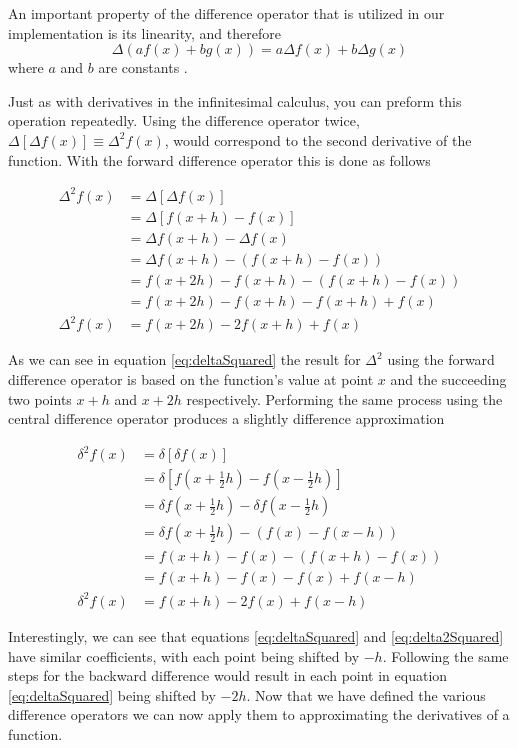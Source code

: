 \documentclass[authoryearcitations]{UoYCSproject}
\begin{document}
An important property of the difference operator that is utilized in our implementation is its linearity,
 and therefore
$$\Delta (af(x) + bg(x)) = a \Delta f(x) + b\Delta g(x) $$
where $a$ and $b$ are constants \cite{Hamming}. 

Just as with derivatives in the infinitesimal calculus, you can preform this operation repeatedly. Using the difference
operator twice, $\Delta [\Delta f(x) ] \equiv \Delta ^2 f(x) $, would correspond to the second derivative of the function. 
With the forward difference operator this is done as follows

\begin{align}
 \Delta ^2 f(x)&= \Delta [\Delta f(x)]  \nonumber\\
		&= \Delta [f(x + h) - f(x)] \nonumber\\
		&= \Delta f(x + h) - \Delta f(x) \nonumber\\  
		&= \Delta f(x + h) - (f(x + h) - f(x)) \nonumber \\
		&= f(x + 2h) - f(x + h) - (f(x + h) - f(x)) \nonumber \\ 
		&= f(x + 2h) - f(x + h) - f(x + h) + f(x) \nonumber \\
 \Delta ^2 f(x)	&= f(x + 2h) - 2f(x + h) + f(x) \label{eq:deltaSquared}
\end{align}

As we can see in equation \ref{eq:deltaSquared} the result for $\Delta ^2$ using the forward difference operator is based 
on the function's value at point $x$ and the succeeding two points $x+h$ and $x+2h$ respectively. Performing the same 
process using the central difference operator produces a slightly difference approximation

\begin{align}
 \delta ^2 f(x)&= \delta [\delta f(x)]  \nonumber\\
		&= \delta [f(x + \frac{1}{2}h) - f(x - \frac{1}{2}h)] \nonumber\\
		&= \delta f(x + \frac{1}{2}h) - \delta f(x - \frac{1}{2}h) \nonumber\\  
		&= \delta f(x + \frac{1}{2}h) - (f(x) - f(x - h)) \nonumber \\
		&= f(x + h) - f(x) - (f(x + h) - f(x)) \nonumber \\ 
		&= f(x + h) - f(x) - f(x) + f(x - h) \nonumber \\
 \delta ^2 f(x)	&= f(x + h) - 2f(x) + f(x - h)\label{eq:delta2Squared}
\end{align}


Interestingly, we can see that equations \ref{eq:deltaSquared} and \ref{eq:delta2Squared} have similar coefficients,
with each point being shifted by $-h$. Following the same steps for the backward difference would result in each point
in equation \ref{eq:deltaSquared} being shifted by $-2h$. Now that we have defined the various difference operators 
we can now apply them to approximating the derivatives of a function. 
\end{document}
